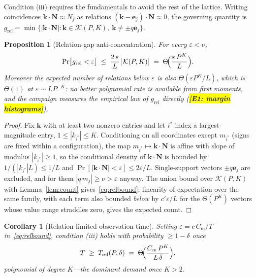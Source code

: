 \documentclass[twocolumn,preprintnumbers,amsmath,amssymb,pra,floatfix]{revtex4-2}
\newcommand{\vect}[1]{\bm{#1}}
\newtheorem{proposition}{Proposition}
\newtheorem{corollary}{Corollary}
\newcommand{\PH}[1]{\colorbox{yellow}{\textbf{\small [#1]}}}
\begin{document}
Condition (iii) requires the fundamentals to avoid the rest of the
lattice.  Writing coincidences $\vect{k}\cdot\vect{N}\approx N_j$ as
relations $(\vect{k}-\vect{e}_j)\cdot\vect{N}\approx0$, the governing
quantity is
$g_{\mathrm{rel}}=\min\{|\vect{k}\cdot\vect{N}|:
\vect{k}\in\mathcal{K}(P,K),\ \vect{k}\ne\pm q\vect{e}_{j}\}$.

\begin{proposition}[Relation-gap anti-concentration]
\label{prop:rel}
For every $\varepsilon<\nu$,
\begin{equation}
  \Pr\bigl[g_{\mathrm{rel}}<\varepsilon\bigr]
  \;\le\;\frac{2\,\varepsilon}{L}\,\bigl|\mathcal{K}(P,K)\bigr|
  \;=\;\Theta\!\Bigl(\frac{\varepsilon\,P^{K}}{L}\Bigr).
  \label{eq:relbound}
\end{equation}
Moreover the expected number of relations below $\varepsilon$ is also
$\Theta(\varepsilon P^{K}/L)$, which is $\Theta(1)$ at
$\varepsilon\sim L P^{-K}$: no better polynomial rate is available
from first moments, and the campaign measures the empirical law of
$g_{\mathrm{rel}}$ directly (\PH{E1: margin histograms}).
\end{proposition}
\begin{proof}
Fix $\vect{k}$ with at least two nonzero entries and let $i^{*}$
index a largest-magnitude entry, $1\le|k_{i^{*}}|\le K$.
Conditioning on all coordinates except $m_{i^{*}}$ (signs are fixed
within a configuration), the map
$m_{i^{*}}\mapsto\vect{k}\cdot\vect{N}$ is affine with slope of
modulus $|k_{i^{*}}|\ge1$, so the conditional density of
$\vect{k}\cdot\vect{N}$ is bounded by $1/(|k_{i^{*}}|L)\le1/L$ and
$\Pr[|\vect{k}\cdot\vect{N}|<\varepsilon]\le2\varepsilon/L$.
Single-support vectors $\pm q\vect{e}_j$ are excluded, and for them
$|q\,m_j|\ge\nu>\varepsilon$ anyway.  The union bound over
$\mathcal{K}(P,K)$ with Lemma~\ref{lem:count}
gives~\eqref{eq:relbound}; linearity of expectation over the same
family, with each term also bounded \emph{below} by
$c'\varepsilon/L$ for the $\Theta(P^{K})$ vectors whose value range
straddles zero, gives the expected count.
\end{proof}

\begin{corollary}[Relation-limited observation time]
\label{cor:relT}
Setting $\varepsilon=c\,C_{\mathrm{m}}/T$ in~\eqref{eq:relbound},
condition (iii) holds with probability $\ge1-\delta$ once
\begin{equation}
  T \;\ge\; T_{\mathrm{rel}}(P,\delta)
  \;=\;\Theta\!\Bigl(\frac{C_{\mathrm{m}}\,P^{K}}{L\,\delta}\Bigr),
  \label{eq:relT}
\end{equation}
polynomial of degree $K$---the dominant demand once $K>2$.
\end{corollary}
\end{document}
